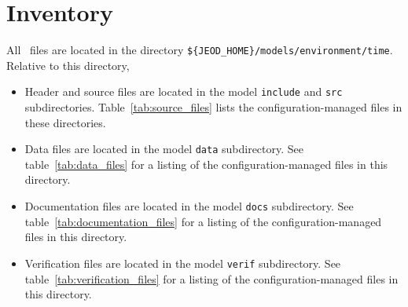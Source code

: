 %
%
% 
%


\section{Inventory}
All \timeDesc\ files are located in the directory \newline
{\tt \$\{JEOD\_HOME\}/models/environment/time}.
Relative to this directory,
\begin{itemize}
\vspace{-0.2\baselineskip}
\item Header and source files are located
in the model {\tt include} and {\tt src} subdirectories.
Table~\ref{tab:source_files} lists the
configuration-managed files in these directories.
\vspace{-0.1\baselineskip}
\item Data files are located in the model {\tt data} subdirectory.
See table~\ref{tab:data_files}
for a listing of the
configuration-managed files in this directory.
\vspace{-0.1\baselineskip}
\item Documentation files are located in the model {\tt docs} subdirectory.
See table~\ref{tab:documentation_files}
for a listing of the
configuration-managed files in this directory.
\vspace{-0.1\baselineskip}
\item Verification files are located in the model {\tt verif} subdirectory.
See table~\ref{tab:verification_files}
for a listing of the
configuration-managed files in this directory.
\end{itemize}


